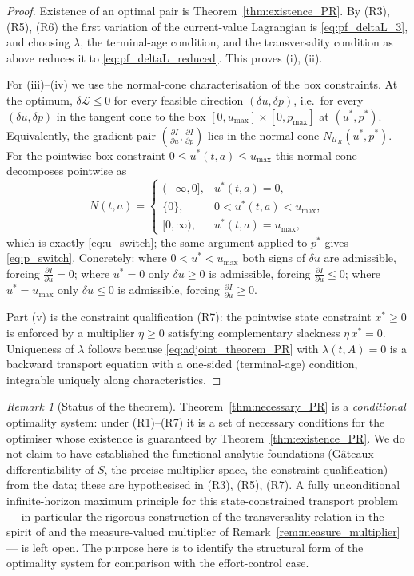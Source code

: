 \documentclass[pdflatex,sn-mathphys-num]{sn-jnl}
\theoremstyle{definition}
\theoremstyle{remark}
\newtheorem{remark}[theorem]{Remark}
\begin{document}
\begin{proof}
Existence of an optimal pair is Theorem~\ref{thm:existence_PR}. By (R3),
(R5), (R6) the first variation of the current-value Lagrangian is
\eqref{eq:pf_deltaL_3}, and choosing $\lambda$, the terminal-age condition,
and the transversality condition as above reduces it to
\eqref{eq:pf_deltaL_reduced}. This proves (i), (ii).

For (iii)--(iv) we use the normal-cone characterisation of the box
constraints. At the optimum,
$\delta\mathcal L\le0$ for every feasible direction $(\delta u,\delta p)$,
i.e.\ for every $(\delta u,\delta p)$ in the tangent cone to the box
$[0,u_{\max}]\times[0,p_{\max}]$ at $(u^\ast,p^\ast)$. Equivalently, the
gradient pair $(\frac{\partial I}{\partial u},\frac{\partial I}{\partial p})$
lies in the normal cone $N_{\mathcal U_R}(u^\ast,p^\ast)$. For the pointwise
box constraint $0\le u^\ast(t,a)\le u_{\max}$ this normal cone decomposes
pointwise as
\[
N(t,a)=\begin{cases}
(-\infty,0], & u^\ast(t,a)=0,\\
\{0\}, & 0<u^\ast(t,a)<u_{\max},\\
[0,\infty), & u^\ast(t,a)=u_{\max},
\end{cases}
\]
which is exactly \eqref{eq:u_switch}; the same argument applied to
$p^\ast$ gives \eqref{eq:p_switch}. Concretely: where $0<u^\ast<u_{\max}$ both
signs of $\delta u$ are admissible, forcing
$\frac{\partial I}{\partial u}=0$; where $u^\ast=0$ only $\delta u\ge0$ is
admissible, forcing $\frac{\partial I}{\partial u}\le0$; where
$u^\ast=u_{\max}$ only $\delta u\le0$ is admissible, forcing
$\frac{\partial I}{\partial u}\ge0$.

Part (v) is the constraint qualification (R7): the pointwise state constraint
$x^\ast\ge0$ is enforced by a multiplier $\eta\ge0$ satisfying complementary
slackness $\eta\,x^\ast=0$. Uniqueness of $\lambda$ follows because
\eqref{eq:adjoint_theorem_PR} with $\lambda(t,A)=0$ is a backward transport
equation with a one-sided (terminal-age) condition, integrable uniquely along
characteristics.
\end{proof}

\begin{remark}[Status of the theorem]
Theorem~\ref{thm:necessary_PR} is a \emph{conditional} optimality system:
under (R1)--(R7) it is a set of necessary conditions for the optimiser whose
existence is guaranteed by Theorem~\ref{thm:existence_PR}. We do not claim to
have established the functional-analytic foundations (G\^ateaux
differentiability of $S$, the precise multiplier space, the constraint
qualification) from the data; these are hypothesised in (R3), (R5), (R7). A
fully unconditional infinite-horizon maximum principle for this
state-constrained transport problem --- in particular the rigorous
construction of the transversality relation in the spirit of
\citep{aseev_pontryagin_2004,aseev_maximum_2015,wang2026elliptic} and the measure-valued
multiplier of Remark~\ref{rem:measure_multiplier} --- is left open. The
purpose here is to identify the structural form of the optimality system for
comparison with the effort-control case.
\end{remark}
\end{document}

